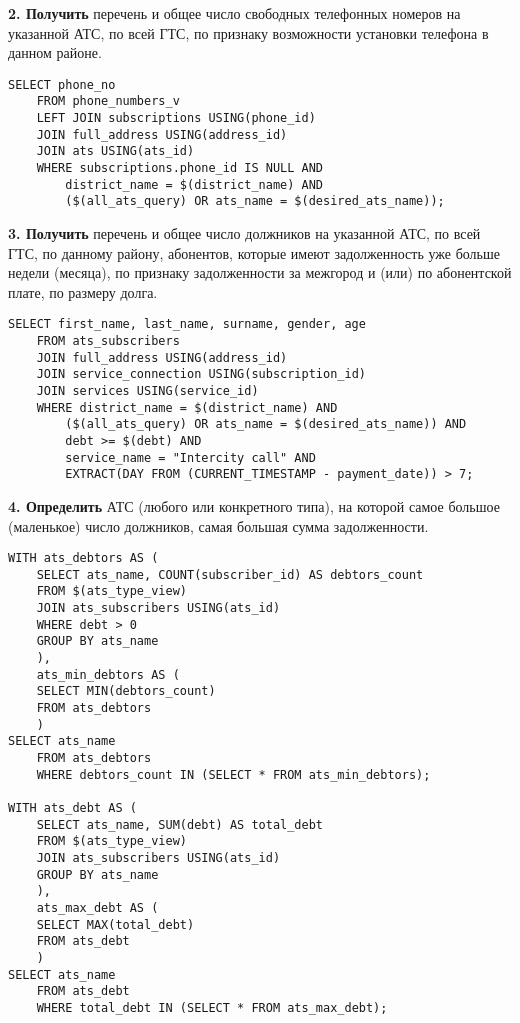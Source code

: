 \documentclass{report}
\begin{document}
\textbf{2. Получить} перечень и общее число свободных телефонных 
номеров на указанной АТС, по всей ГТС, по признаку возможности установки 
телефона в данном районе.

\begin{lstlisting}
SELECT phone_no 
    FROM phone_numbers_v
    LEFT JOIN subscriptions USING(phone_id)
    JOIN full_address USING(address_id)
    JOIN ats USING(ats_id)
    WHERE subscriptions.phone_id IS NULL AND 
        district_name = $(district_name) AND 
        ($(all_ats_query) OR ats_name = $(desired_ats_name));
\end{lstlisting}

\textbf{3. Получить} перечень и общее число должников на указанной АТС, 
по всей ГТС, по данному району, абонентов, которые имеют задолженность 
уже больше недели (месяца), по признаку задолженности за межгород и (или) 
по абонентской плате, по размеру долга.

\begin{lstlisting}
SELECT first_name, last_name, surname, gender, age
    FROM ats_subscribers 
    JOIN full_address USING(address_id)
    JOIN service_connection USING(subscription_id)
    JOIN services USING(service_id)
    WHERE district_name = $(district_name) AND 
        ($(all_ats_query) OR ats_name = $(desired_ats_name)) AND 
        debt >= $(debt) AND 
        service_name = "Intercity call" AND
        EXTRACT(DAY FROM (CURRENT_TIMESTAMP - payment_date)) > 7;
\end{lstlisting}

\textbf{4. Определить} АТС (любого или конкретного типа), на которой 
самое большое (маленькое) число должников, самая большая сумма задолженности.

\begin{lstlisting}
WITH ats_debtors AS (
    SELECT ats_name, COUNT(subscriber_id) AS debtors_count
    FROM $(ats_type_view) 
    JOIN ats_subscribers USING(ats_id)
    WHERE debt > 0
    GROUP BY ats_name
    ), 
    ats_min_debtors AS (
    SELECT MIN(debtors_count)
    FROM ats_debtors 
    )
SELECT ats_name
    FROM ats_debtors
    WHERE debtors_count IN (SELECT * FROM ats_min_debtors);

WITH ats_debt AS (
    SELECT ats_name, SUM(debt) AS total_debt
    FROM $(ats_type_view) 
    JOIN ats_subscribers USING(ats_id)
    GROUP BY ats_name
    ), 
    ats_max_debt AS (
    SELECT MAX(total_debt)
    FROM ats_debt 
    )
SELECT ats_name
    FROM ats_debt
    WHERE total_debt IN (SELECT * FROM ats_max_debt);
\end{lstlisting}
\end{document}
